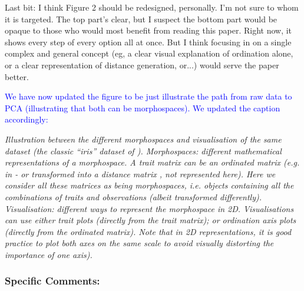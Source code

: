\documentclass[12pt,letterpaper]{article}
\begin{document}

\noindent Last bit: I think Figure 2 should be redesigned, personally. I'm not sure to whom it is targeted. The top part's clear, but I suspect the bottom part would be opaque to those who would most benefit from reading this paper. Right now, it shows every step of every option all at once. But I think focusing in on a single complex and general concept (eg, a clear visual explanation of ordination alone, or a clear representation of distance generation, or...) would serve the paper better. 

\textcolor{blue}{We have now updated the figure to be just illustrate the path from raw data to PCA (illustrating that both can be morphospaces). We updated the caption accordingly:}

\textit{Illustration between the different morphospaces and visualisation of the same dataset (the classic ``iris'' dataset of \citealt{edgar1935irises,fisher1936use}).
Morphospaces: different mathematical representations of a morphospace. A trait matrix can be an ordinated matrix (e.g. in \citealt{tyler2011detecting} - or transformed into a distance matrix \citealt{Close2015}, not represented here). %
Here we consider all these matrices as being \textit{morphospaces}, i.e. objects containing all the combinations of traits and observations (albeit transformed differently).
Visualisation: different  ways to represent the morphospace in 2D.
Visualisations can use either trait plots (directly from the trait matrix); or ordination axis plots (directly from the ordinated matrix).
Note that in 2D representations, it is good practice to plot both axes on the same scale to avoid visually distorting the importance of one axis).}

\subsubsection{Specific Comments:}
\end{document}
